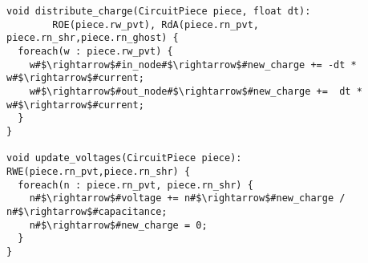 \begin{lstlisting}[float={t},label={lst:code_ex},caption={Circuit simulation.}]
void distribute_charge(CircuitPiece piece, float dt):
        ROE(piece.rw_pvt), RdA(piece.rn_pvt, piece.rn_shr,piece.rn_ghost) {
  foreach(w : piece.rw_pvt) {
    w#$\rightarrow$#in_node#$\rightarrow$#new_charge += -dt * w#$\rightarrow$#current;
    w#$\rightarrow$#out_node#$\rightarrow$#new_charge +=  dt * w#$\rightarrow$#current;
  }
}

void update_voltages(CircuitPiece piece): RWE(piece.rn_pvt,piece.rn_shr) {
  foreach(n : piece.rn_pvt, piece.rn_shr) {
    n#$\rightarrow$#voltage += n#$\rightarrow$#new_charge / n#$\rightarrow$#capacitance;
    n#$\rightarrow$#new_charge = 0;
  }
}
\end{lstlisting}
